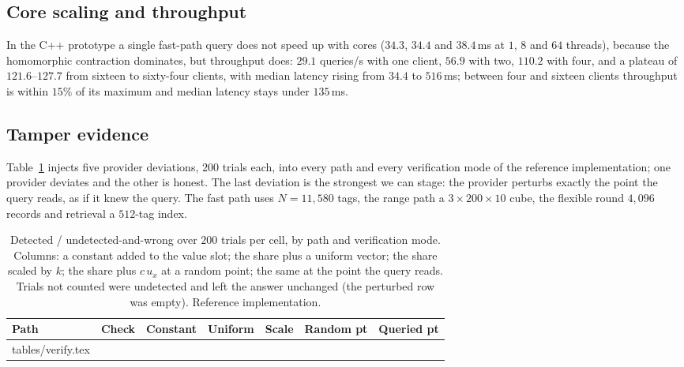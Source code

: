 \documentclass[a4paper,fleqn]{cas-sc}
\begin{document}
\subsection{Core scaling and throughput}
\label{sec:scaling}
In the C++ prototype a single fast-path query does not speed up with cores
($34.3$, $34.4$ and $38.4$\,ms at $1$, $8$ and $64$ threads), because the
homomorphic contraction dominates, but throughput does: $29.1$ queries/s with
one client, $56.9$ with two, $110.2$ with four, and a plateau of
$121.6$--$127.7$ from sixteen to sixty-four clients, with median latency rising
from $34.4$ to $516$\,ms; between four and sixteen clients throughput is within
$15\%$ of its maximum and median latency stays under $135$\,ms.

\subsection{Tamper evidence}
\label{sec:verifyresult}
Table~\ref{tab:verify} injects five provider deviations, $200$ trials each, into
every path and every verification mode of the reference implementation; one
provider deviates and the other is honest. The last deviation is the strongest
we can stage: the provider perturbs exactly the point the query reads, as if it
knew the query. The fast path uses $N=11{,}580$ tags, the range path a
$3\times200\times10$ cube, the flexible round $4{,}096$ records and retrieval a
$512$-tag index.

\begin{table}[pos=htbp]
\caption{Detected / undetected-and-wrong over $200$ trials per cell, by path
and verification mode. Columns: a constant added to the value slot; the share
plus a uniform vector; the share scaled by $k$; the share plus $c\,u_x$ at a
random point; the same at the point the query reads. Trials not counted were
undetected and left the answer unchanged (the perturbed row was empty).
Reference implementation.}
\label{tab:verify}
\centering
\footnotesize
\setlength{\tabcolsep}{3pt}
\begin{tabular*}{\tblwidth}{@{\extracolsep{\fill}}llccccc@{}}
\toprule
Path & Check & Constant & Uniform & Scale & Random pt & Queried pt \\
\midrule
{} tables/verify.tex 
\bottomrule
\end{tabular*}
\end{table}
\end{document}
